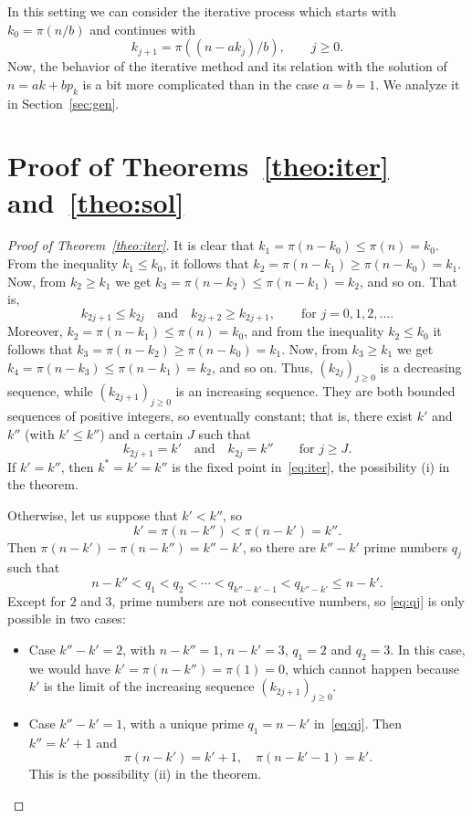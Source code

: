 \documentclass[12pt,reqno]{article}
\begin{document}
In this setting we can consider the iterative process which starts with $k_0 = \pi(n/b)$ and continues with
\[
  k_{j+1} = \pi((n-ak_j)/b), 
  \qquad j \ge 0.
\]
Now, the behavior of the iterative method and its relation with the solution of $n = ak + bp_k$ is a bit more complicated than in the case $a=b=1$. We analyze it in Section~\ref{sec:gen}.

\section{Proof of Theorems~\ref{theo:iter} and~\ref{theo:sol}}
\label{sec:proofs}

\begin{proof}[Proof of Theorem~\ref{theo:iter}]
It is clear that $k_1 = \pi(n-k_0) \le \pi(n) = k_0$. From the inequality $k_1 \le k_0$, it follows that $k_2 = \pi(n-k_1) \ge \pi(n-k_0) = k_1$. Now, from $k_2 \ge k_1$ we get $k_3 = \pi(n-k_2) \le \pi(n-k_1) = k_2$, and so on. That is,
\begin{equation}
\label{eq:alterna}
  k_{2j+1} \le k_{2j}
  \quad\text{and}\quad
  k_{2j+2} \ge k_{2j+1},
  \qquad \text{for }j = 0,1,2,\dots.
\end{equation}
Moreover, $k_2 = \pi(n-k_1) \le \pi(n) = k_0$, and from the inequality $k_2 \le k_0$ it follows that $k_3 = \pi(n-k_2) \ge \pi(n-k_0) = k_1$. Now, from $k_3 \ge k_1$ we get $k_4 = \pi(n-k_3) \le \pi(n-k_1) = k_2$, and so on. Thus, $(k_{2j})_{j\ge0}$ is a decreasing sequence, while $(k_{2j+1})_{j\ge0}$ is an increasing sequence. They are both bounded sequences of positive integers, so eventually constant; that is, there exist $k'$ and $k''$ (with $k' \le k''$) and a certain $J$ such that
\[
  k_{2j+1} = k' 
  \quad\text{and}\quad
  k_{2j} = k'' 
  \qquad \text{for }j \ge J.
\]
If $k' = k''$, then $k^{*} = k'=k''$ is the fixed point in~\eqref{eq:iter}, the possibility (i) in the theorem. 

Otherwise, let us suppose that $k' < k''$, so
\[
  k' = \pi(n-k'') < \pi(n-k') = k''.
\]
Then $\pi(n-k')-\pi(n-k'')=k''-k'$, so there are $k''-k'$ prime numbers $q_j$ such that
\begin{equation}
\label{eq:qj}
  n-k'' < q_1 < q_2 < \cdots < q_{k''-k'-1} < q_{k''-k'} \le n-k'.
\end{equation}
Except for $2$ and $3$, prime numbers are not consecutive numbers, so \eqref{eq:qj} is only possible in two cases:
\begin{itemize}
\item Case $k''-k'=2$, with $n-k''=1$, $n-k'=3$, $q_1 = 2$ and $q_2=3$. 
In this case, we would have $k' = \pi(n-k'') = \pi(1) = 0$, which cannot happen because $k'$ is the limit of the increasing sequence $(k_{2j+1})_{j\ge0}$.
\item Case $k''-k'=1$, with a unique prime $q_1 = n-k'$ in~\eqref{eq:qj}. Then $k''=k'+1$ and
\[
  \pi(n-k') = k'+1, \quad \pi(n-k'-1) = k'.
\]
This is the possibility (ii) in the theorem.
\qedhere
\end{itemize}
\end{proof}
\end{document}
